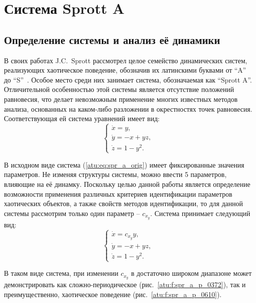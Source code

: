 
\FloatBarrier
\section{Система Sprott A}  %
\label{atu:sect:spr_a}


\subsection{Определение системы и анализ её динамики} %

В своих работах J.C.~Sprott рассмотрел целое семейство динамических
систем, реализующих хаотическое поведение, обозначив их латинскими буквами
от ``A'' до ``S''~\cite{sprott_212,sprott_strange_attr}. Особое место среди них
занимает система, обозначаемая как ``Sprott A''. Отличительной особенностью
этой системы является отсутствие положений равновесия, что делает
невозможным применение многих известных методов анализа, основанных на
каком-либо разложении в окрестностях точек равновесия. Соответствующая ей
система уравнений имеет вид:
%
\begin{equation}
  \begin{cases}
    \dot{x} =  y, \\
    \dot{y} = -x + yz, \\
    \dot{z} =  1 - y^2.
  \end{cases}
  \label{atu:eq:spr_a_orig}
\end{equation}


В исходном виде система (\ref{atu:eq:spr_a_orig}) имеет фиксированные значения параметров.
Не изменяя структуры системы, можно ввести 5 параметров, влияющие на её динамку.
Поскольку целью данной работы является определение возможности применения
различных критериев идентификации параметров
хаотических объектов, а также свойств методов идентификации, то для данной системы
рассмотрим только один параметр -- $c_{x_y} $. Система принимает следующий вид:
%
\begin{equation}
  \begin{cases}
    \dot{x} =  c_{x_y} y, \\
    \dot{y} = -x + yz, \\
    \dot{z} =  1 - y^2.
  \end{cases}
  \label{atu:eq:spr_a}
\end{equation}

В таком виде система, при изменении $c_{x_y} $
в достаточно широком диапазоне может демонстрировать как
сложно-периодическое (рис.~\ref{atu:f:spr_a_p_0372}), так и преимущественно, хаотическое
поведение (рис.~\ref{atu:f:spr_a_p_0610}).

